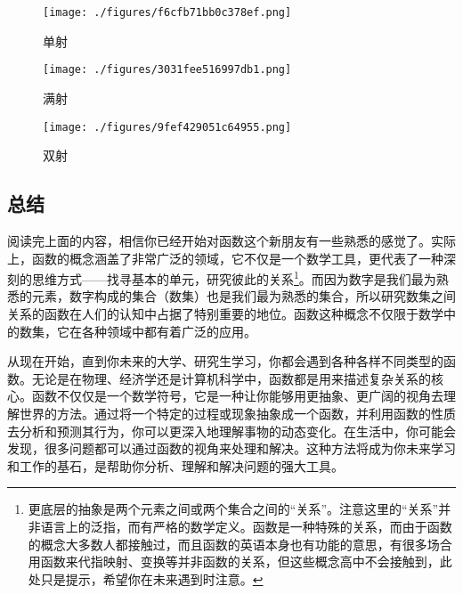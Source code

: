 \begin{figure}[ht]
\centering
\texttt{[image: ./figures/f6cfb71bb0c378ef.png]}
\caption{单射}\label{fig_functi_2}
\end{figure}
\begin{figure}[ht]
\centering
\texttt{[image: ./figures/3031fee516997db1.png]}
\caption{满射} \label{fig_functi_3}
\end{figure}
\begin{figure}[ht]
\centering
\texttt{[image: ./figures/9fef429051c64955.png]}
\caption{双射} \label{fig_functi_4}
\end{figure}
\subsection{总结}

阅读完上面的内容，相信你已经开始对函数这个新朋友有一些熟悉的感觉了。实际上，函数的概念涵盖了非常广泛的领域，它不仅是一个数学工具，更代表了一种深刻的思维方式——找寻基本的单元，研究彼此的关系\footnote{更底层的抽象是两个元素之间或两个集合之间的“关系”。注意这里的“关系”并非语言上的泛指，而有严格的数学定义。函数是一种特殊的关系，而由于函数的概念大多数人都接触过，而且函数的英语本身也有功能的意思，有很多场合用函数来代指映射、变换等并非函数的关系，但这些概念高中不会接触到，此处只是提示，希望你在未来遇到时注意。}。而因为数字是我们最为熟悉的元素，数字构成的集合（数集）也是我们最为熟悉的集合，所以研究数集之间关系的函数在人们的认知中占据了特别重要的地位。函数这种概念不仅限于数学中的数集，它在各种领域中都有着广泛的应用。

从现在开始，直到你未来的大学、研究生学习，你都会遇到各种各样不同类型的函数。无论是在物理、经济学还是计算机科学中，函数都是用来描述复杂关系的核心。函数不仅仅是一个数学符号，它是一种让你能够用更抽象、更广阔的视角去理解世界的方法。通过将一个特定的过程或现象抽象成一个函数，并利用函数的性质去分析和预测其行为，你可以更深入地理解事物的动态变化。在生活中，你可能会发现，很多问题都可以通过函数的视角来处理和解决。这种方法将成为你未来学习和工作的基石，是帮助你分析、理解和解决问题的强大工具。
